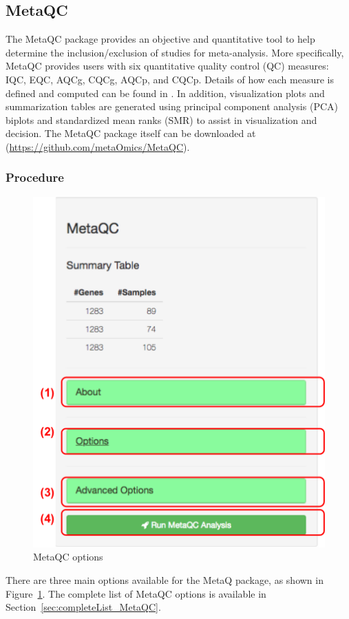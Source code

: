\subsection{MetaQC}
The MetaQC package provides an objective and quantitative tool to help determine the inclusion/exclusion of studies for meta-analysis. More specifically, MetaQC provides users with six quantitative quality control (QC) measures:  IQC, EQC, AQCg, CQCg, AQCp, and CQCp. Details of how each measure is defined and computed can be found in \cite{kang2012metaqc}. In addition, visualization plots and summarization tables are generated using principal component analysis (PCA) biplots and standardized mean ranks (SMR) to assist in visualization and decision. 
The MetaQC package itself can be downloaded at (\url{https://github.com/metaOmics/MetaQC}). 
\subsubsection{Procedure}

\begin{figure}[H]
\begin{center}
\includegraphics[scale=0.5]{./figure/metaQC/metaQCoption.pdf}
\caption{MetaQC options}
\label{fig:MetaQCoption}
\end{center}
\end{figure}
There are three main options available for the MetaQ package, 
as shown in Figure~\ref{fig:MetaQCoption}. 
The complete list of MetaQC options is available in Section~\ref{sec:completeList_MetaQC}.

